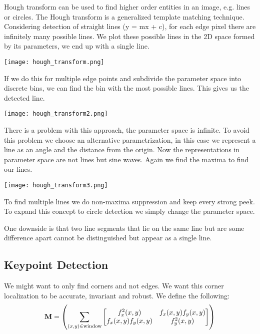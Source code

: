 Hough transform can be used to find higher order entities in an image, e.g. lines or circles. The Hough transform is a generalized template matching technique. Considering detection of straight lines (y = mx + c), for each edge pixel there are infinitely many possible lines. We plot these possible lines in the 2D space formed by its parameters, we end up with a single line.
\begin{center}
	\texttt{[image: hough\_transform.png]}
\end{center}

If we do this for multiple edge points and subdivide the parameter space into discrete bins, we can find the bin with the most possible lines. This gives us the detected line.
\begin{center}
	\texttt{[image: hough\_transform2.png]}
\end{center}

There is a problem with this approach, the parameter space is infinite. To avoid this problem we choose an alternative parametrization, in this case we represent a line as an angle and the distance from the origin. Now the representations in parameter space are not lines but sine waves. Again we find the maxima to find our lines.
\begin{center}
	\texttt{[image: hough\_transform3.png]}
\end{center}

To find multiple lines we do non-maxima suppression and keep every strong peek. To expand this concept to circle detection we simply change the parameter space. \medskip

One downside is that two line segments that lie on the same line but are some difference apart cannot be distinguished but appear as a single line.


\subsection{Keypoint Detection}

We might want to only find corners and not edges. We want this corner localization to be accurate, invariant and robust. We define the following:
$$\textbf M = \left( \sum_{(x,y) \in \text{window}} 
\begin{bmatrix}
    f_x^2(x,y) & f_x(x,y) f_y(x,y) \\
    f_x(x,y) f_y(x,y) & f_y^2(x,y)
\end{bmatrix}
\right)$$

